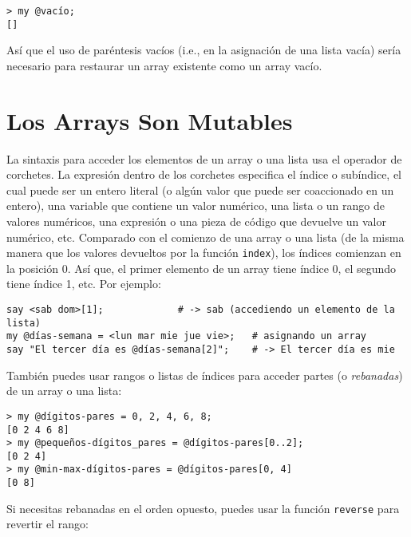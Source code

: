 \begin{verbatim}
> my @vacío;
[]
\end{verbatim}

Así que el uso de paréntesis vacíos (i.e., en la asignación
de una lista vacía) sería necesario para restaurar un
array existente como un array vacío.

\section{Los Arrays Son Mutables}
\label{mutable}

La sintaxis para acceder los elementos de un array o una lista
usa el operador de corchetes. La expresión dentro de los corchetes
especifica el índice o subíndice, el cual puede ser un 
entero literal (o algún valor que puede ser coaccionado en un 
entero), una variable que contiene un valor numérico,
una lista o un rango de valores numéricos, una expresión o una pieza
de código que devuelve un valor numérico, etc. Comparado con el
comienzo de una array o una lista (de la misma 
manera que los valores devueltos por la función {\tt index}),
los índices comienzan en la posición 0. Así que, el primer elemento
de un array tiene índice 0, el segundo tiene índice 1, etc. Por ejemplo:


\begin{verbatim}
say <sab dom>[1];             # -> sab (accediendo un elemento de la lista)
my @días-semana = <lun mar mie jue vie>;   # asignando un array
say "El tercer día es @días-semana[2]";    # -> El tercer día es mie
\end{verbatim}
%

También puedes usar rangos o listas de índices para acceder
partes (o \emph{rebanadas}) de un array o una lista:

\begin{verbatim}
> my @dígitos-pares = 0, 2, 4, 6, 8;
[0 2 4 6 8]
> my @pequeños-dígitos_pares = @dígitos-pares[0..2];
[0 2 4]
> my @min-max-dígitos-pares = @dígitos-pares[0, 4]
[0 8]
\end{verbatim}

Si necesitas rebanadas en el orden opuesto, puedes usar
la función {\tt reverse} para revertir el rango:


